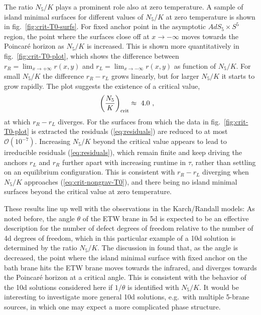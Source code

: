 \documentclass[aps,prd,11pt,notitlepage,longbibliography,nofootinbib,tightenlines,preprintnumbers]{revtex4-1}
\begin{document}
The ratio $N_5/K$ plays a prominent role also at zero temperature.
A sample of island minimal surfaces for different values of $N_5/K$ at zero temperature is shown in fig.~\ref{fig:crit-T0-surfs}.
For fixed anchor point in the asymptotic $AdS_5\times S^5$ region, the point where the surfaces close off at $x\rightarrow -\infty$ moves towards the Poincar\'e horizon as $N_5/K$ is increased. 
%
This is shown more quantitatively in fig.~\ref{fig:crit-T0-plot}, which shows the difference between $r_R=\lim_{x\rightarrow +\infty}r(x,y)$ and $r_L=\lim_{x\rightarrow -\infty} r(x,y)$ as function of $N_5/K$.
For small $N_5/K$ the difference $r_R-r_L$ grows linearly, but for larger $N_5/K$ it starts to grow rapidly.
The plot suggests the existence of a critical value, 
\begin{align}\label{eq:crit-nongrav-T0}
	\left(\frac{N_5}{K}\right)_{\rm crit}&\approx \ 4.0~,
\end{align}
at which $r_R-r_L$ diverges.
For the surfaces from which the data in fig.~\ref{fig:crit-T0-plot} is extracted the residuals (\ref{eq:residuals}) are reduced to at most $\mathcal O(10^{-7})$.
Increasing $N_5/K$ beyond the critical value appears to lead to irreducible residuals (\ref{eq:residuals}), which remain finite and keep driving the anchors $r_L$ and $r_R$ further apart with increasing runtime in $\tau$, rather than settling on an equilibrium configuration.
%
This is consistent with $r_R-r_L$ diverging when $N_5/K$ approaches (\ref{eq:crit-nongrav-T0}), and there being no island minimal surfaces beyond the critical value at zero temperature.

These results line up well with the observations in the Karch/Randall models: As noted before, the angle $\theta$ of the ETW brane in 5d is expected to be an effective description for the number of defect degrees of freedom relative to the number of 4d degrees of freedom, which in this particular example of a 10d solution is determined by the ratio $N_5/K$.
The discussion in \cite{Geng:2020fxl} found that, as the angle is decreased, the point where the island minimal surface with fixed anchor on the bath brane hits the ETW brane moves towards the infrared, and diverges towards the Poincar\'e horizon at a critical angle.
%
This is consistent with the behavior of the 10d solutions considered here if $1/\theta$ is identified with $N_5/K$.
It would be interesting to investigate more general 10d solutions, e.g.\ with multiple 5-brane sources, in which one may expect a more complicated phase structure.
\end{document}
